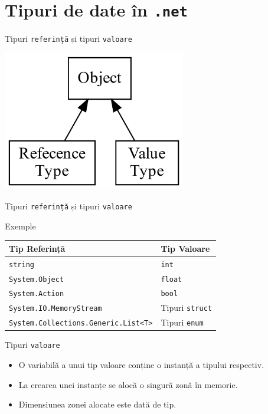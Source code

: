 \documentclass[presentation]{beamer}
\begin{document}
\section{Tipuri de date în \texttt{.net}}
\label{sec:org2c4a03a}
\begin{frame}[label={sec:orgb3c7abe},fragile]{Tipuri \texttt{referință} și tipuri \texttt{valoare}}
 \begin{center}
\includegraphics[width=0.6\textwidth]{./img/netcore-types.png}
\end{center}
\end{frame}
\begin{frame}[label={sec:orgbfe7a49},fragile]{Tipuri \texttt{referință} și tipuri \texttt{valoare}}
 \begin{block}{Exemple}
\begin{center}
\begin{tabular}{ll}
Tip Referință & Tip Valoare\\
\hline
\texttt{string} & \texttt{int}\\
\texttt{System.Object} & \texttt{float}\\
\texttt{System.Action} & \texttt{bool}\\
\texttt{System.IO.MemoryStream} & Tipuri \texttt{struct}\\
\texttt{System.Collections.Generic.List<T>} & Tipuri \texttt{enum}\\
\end{tabular}
\end{center}
\end{block}
\end{frame}
\begin{frame}[label={sec:org5bbc74c},fragile]{Tipuri \texttt{valoare}}
 \begin{itemize}
\item O variabilă a unui tip valoare conține o instanță a tipului respectiv.
\item La crearea unei instanțe se alocă o singură zonă în memorie.
\item Dimensiunea zonei alocate este dată de tip.
\end{itemize}
\end{frame}
\end{document}
